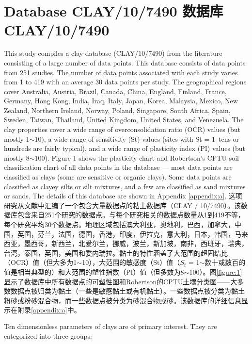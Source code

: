 \section{Database CLAY/10/7490 数据库CLAY/10/7490}

\begin{Parallel}{0.60\textwidth}{}
    \ParallelLText
    {
        This study compiles a clay database (CLAY/10/7490) from the literature consisting of a large number of data points. This database consists of data points from 251 studies. The number of data points associated with each study varies from 1 to 419 with an average 30 data points per study. The geographical regions cover Australia, Austria, Brazil, Canada, China, England, Finland, France, Germany, Hong Kong, India, Iraq, Italy, Japan, Korea, Malaysia, Mexico, New Zealand, Northern Ireland, Norway, Poland, Singapore, South Africa, Spain, Sweden, Taiwan, Thailand, United Kingdom, United States, and Venezuela. The clay properties cover a wide range of overconsolidation ratio (OCR) values (but mostly 1$\sim$10), a wide range of sensitivity (St) values (sites with St = 1~tens or hundreds are fairly typical), and a wide range of plasticity index (PI) values (but mostly 8$\sim$100). Figure 1 shows the plasticity chart and Robertson’s CPTU soil classification chart \citep{Robertson1990151} of all data points in the database — most data points are classified as clays (some are sensitive or organic clays). Some data points are classified as clayey silts or silt mixtures, and a few are classified as sand mixtures or sands. The details of this database are shown in Appendix \ref{appendix:a}.
    }
    \ParallelRText
    {
        这项研究从文献中汇编了一个包含大量数据点的粘土数据库（CLAY / 10/7490）。该数据库包含来自251个研究的数据点。与每个研究相关的数据点数量从1到419不等，每个研究平均30个数据点。地理区域包括澳大利亚，奥地利，巴西，加拿大，中国，英国，芬兰，法国，德国，香港，印度，伊拉克，意大利，日本，韩国，马来西亚，墨西哥，新西兰，北爱尔兰，挪威，波兰，新加坡，南非，西班牙，瑞典，台湾，泰国，英国，美国和委内瑞拉。黏土的特性涵盖了大范围的超固结比（OCR）值（但大多为1$\sim$10），大范围的敏感度（St）值（$S_t$ = 1$\sim$数十或数百的值是相当典型的）和大范围的塑性指数（PI）值（但多数为8$\sim$100）。图\ref{figure:1}显示了数据库中所有数据点的可塑性图和Robertson的CPTU土壤分类图\citep{Robertson1990151}——大多数数据点被归类为黏土（一些是敏感黏土或有机黏土）。一些数据点被分类为黏土粉砂或粉砂混合物，而一些数据点被分类为砂混合物或砂。该数据库的详细信息显示在附录\ref{appendix:a}中。
    }
    \ParallelPar
    
    \ParallelLText
    {
        Ten dimensionless parameters of clays are of primary interest. They are categorized into three groups:

}
\end{Parallel}
